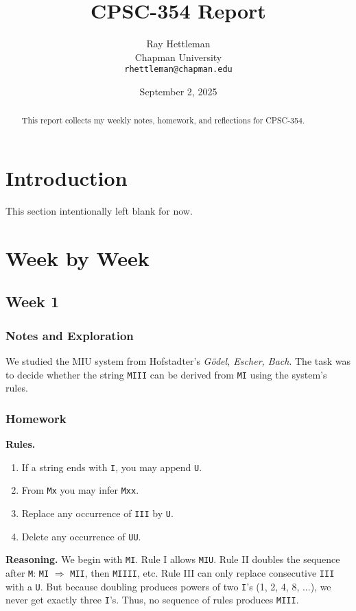 \documentclass[11pt]{article}
\title{CPSC-354 Report}
\author{Ray Hettleman \\ Chapman University \\ \texttt{rhettleman@chapman.edu}}
\date{September 2, 2025}
\begin{document}
\maketitle

\begin{abstract}
This report collects my weekly notes, homework, and reflections for CPSC-354. 
\end{abstract}

\tableofcontents
\newpage

\section{Introduction}
This section intentionally left blank for now.

\section{Week by Week}

\subsection{Week 1}

\subsubsection{Notes and Exploration}
We studied the MIU system from Hofstadter’s \emph{Gödel, Escher, Bach}. The task was to decide whether the string \texttt{MIII} can be derived from \texttt{MI} using the system’s rules.

\subsubsection{Homework}
\textbf{Rules.}
\begin{enumerate}[label=\Roman*.]
  \item If a string ends with \texttt{I}, you may append \texttt{U}.
  \item From \texttt{Mx} you may infer \texttt{Mxx}.
  \item Replace any occurrence of \texttt{III} by \texttt{U}.
  \item Delete any occurrence of \texttt{UU}.
\end{enumerate}

\textbf{Reasoning.}  
We begin with \texttt{MI}.  
Rule I allows \texttt{MIU}.  
Rule II doubles the sequence after \texttt{M}: \texttt{MI} $\Rightarrow$ \texttt{MII}, then \texttt{MIIII}, etc.  
Rule III can only replace consecutive \texttt{III} with a \texttt{U}.  
But because doubling produces powers of two \texttt{I}'s (1, 2, 4, 8, ...), 
we never get exactly three \texttt{I}'s.  
Thus, no sequence of rules produces \texttt{MIII}.  
\end{document}
